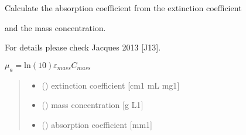 \documentclass[letterpaper,10pt,english]{sphinxmanual}
\begin{document}
\begin{fulllineitems}
\label{\detokenize{03_absorption_coefficient:skinoptics.absorption_coefficient.mua_from_ext_and_Cmass}}
\pysigstartsignatures
{}
\pysigstopsignatures
\begin{DUlineblock}{0em}
\item[] Calculate the absorption coefficient from the extinction coefficient
\item[] and the mass concentration.
\item[] For details please check Jacques 2013 {[}J13{]}.
\end{DUlineblock}

\sphinxAtStartPar
\(\mu_a = \mbox{ln}(10) \varepsilon_{mass} C_{mass}\)
\begin{quote}\begin{description}
\begin{itemize}
\item {} 
\sphinxAtStartPar
{} () \textendash{} extinction coefficient {[}cm\sphinxhyphen{}1 mL mg\sphinxhyphen{}1{]}

\item {} 
\sphinxAtStartPar
{} () \textendash{} mass concentration {[}g L\sphinxhyphen{}1{]}

\end{itemize}

\sphinxAtStartPar
\begin{itemize}
\item {} 
\sphinxAtStartPar
{} () \textendash{} absorption coefficient {[}mm\sphinxhyphen{}1{]}

\end{itemize}


\end{description}\end{quote}

\end{fulllineitems}
\end{document}
